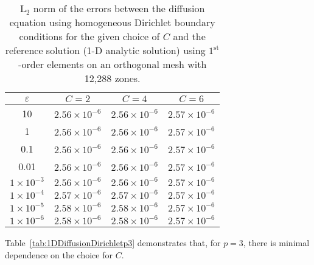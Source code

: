 \documentclass[12pt,letterpaper]{article}
\begin{document}
\begin{table}[!h]
\centering
{\renewcommand{\arraystretch}{1.5}
\begin{tabular}{|c|c|c|c|}
\hline
$\varepsilon$ & $C=2$ & $C=4$ & $C=6$ \\\hline
10 & $2.56 \times 10^{-6}$ & $2.56 \times 10^{-6}$ & $2.57 \times 10^{-6}$ \\\hline
1 & $2.56 \times 10^{-6}$ & $2.56 \times 10^{-6}$ & $2.57 \times 10^{-6}$ \\\hline
0.1 & $2.56 \times 10^{-6}$ & $2.56 \times 10^{-6}$ & $2.57 \times 10^{-6}$ \\\hline
0.01 & $2.56 \times 10^{-6}$ & $2.56 \times 10^{-6}$ & $2.57 \times 10^{-6}$ \\\hline
$1 \times 10^{-3}$ & $2.56 \times 10^{-6}$ & $2.56 \times 10^{-6}$ & $2.57 \times 10^{-6}$ \\\hline
$1 \times 10^{-4}$ & $2.57 \times 10^{-6}$ & $2.57 \times 10^{-6}$ & $2.57 \times 10^{-6}$ \\\hline
$1 \times 10^{-5}$ & $2.58 \times 10^{-6}$ & $2.58 \times 10^{-6}$ & $2.57 \times 10^{-6}$ \\\hline
$1 \times 10^{-6}$ & $2.58 \times 10^{-6}$ & $2.58 \times 10^{-6}$ & $2.57 \times 10^{-6}$ \\\hline
\end{tabular}}
\caption{L$_2$ norm of the errors between the diffusion equation using homogeneous Dirichlet boundary conditions for the given choice of $C$ and the reference solution (1-D analytic solution) using $1^\text{st}$-order elements on an orthogonal mesh with 12,288 zones.}
\label{tab:1DDiffusionDirichletp1}
\end{table}
%
Table~\ref{tab:1DDiffusionDirichletp3} demonstrates that, for $p=3$, there is minimal dependence on the choice for $C$.
%
\end{document}
